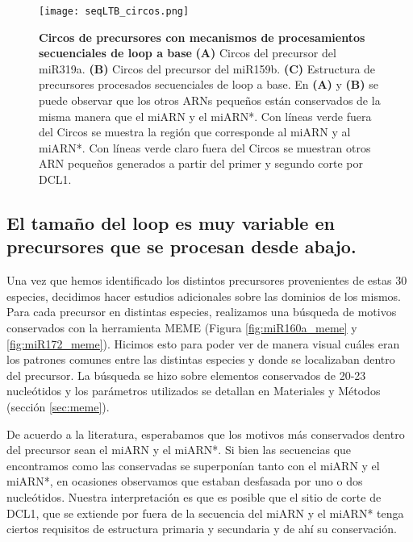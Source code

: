 \begin{landscape}
    \begin{figure}[htbp!] 
        \centering    
        \texttt{[image: seqLTB\_circos.png]}
        \caption[Circos de precursores con mecanismos de procesamientos secuenciales de loop a base]{
        \textbf{Circos de precursores con mecanismos de procesamientos secuenciales de loop a base}
		 \textbf{(A)} Circos del precursor del miR319a.
		 \textbf{(B)} Circos del precursor del miR159b.
		 \textbf{(C)} Estructura de precursores procesados secuenciales de loop a base.
		 En \textbf{(A)} y \textbf{(B)} se puede observar que los otros ARNs pequeños están conservados de la misma manera que el miARN y el miARN*.
        Con líneas verde fuera del Circos se muestra la región que corresponde al miARN y al miARN*. 
        Con líneas verde claro fuera del Circos se muestran otros ARN pequeños generados a partir del primer y segundo corte por DCL1.
		}
         \label{fig:seqLTB_circos}
    \end{figure}
\end{landscape}


\subsection{El tamaño del loop es muy variable en precursores que se procesan desde abajo.}

Una vez que hemos identificado los distintos precursores provenientes de estas 30 especies, decidimos hacer estudios adicionales sobre las dominios de los mismos.
Para cada precursor en distintas especies, realizamos una búsqueda de motivos conservados con la herramienta MEME \citep{pmid22115189} (Figura \ref{fig:miR160a_meme} y \ref{fig:miR172_meme}).
Hicimos esto para poder ver de manera visual cuáles eran los patrones comunes entre las distintas especies y donde se localizaban dentro del precursor.
La búsqueda se hizo sobre elementos conservados de 20-23 nucleótidos y los parámetros utilizados se detallan en Materiales y Métodos (sección \ref{sec:meme}).

De acuerdo a la literatura, esperabamos que los motivos más conservados dentro del precursor sean el miARN y el miARN*.
Si bien las secuencias que encontramos como las conservadas se superponían tanto con el miARN y el miARN*, en ocasiones observamos que estaban desfasada por uno o dos nucleótidos.
Nuestra interpretación es que es posible que el sitio de corte de DCL1, que se extiende por fuera de la secuencia del miARN y el miARN* tenga ciertos requisitos de estructura primaria y secundaria y de ahí su conservación.


